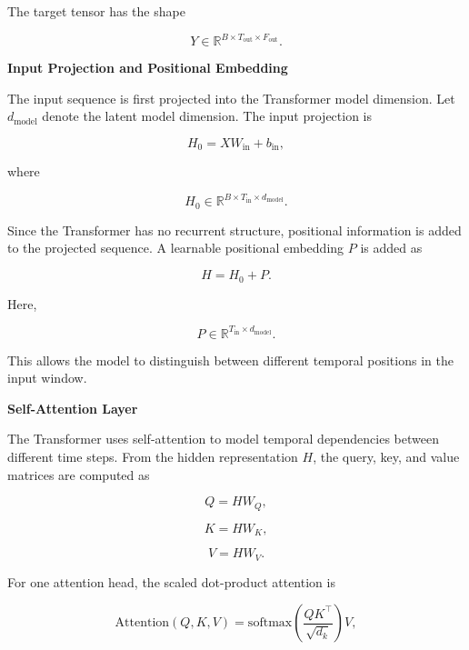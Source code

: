 \documentclass{book}
\providecommand{\ProjectDeepHeading}[2]{%
    \par\medskip\noindent\textbf{#2}\par\smallskip
}
\begin{document}
        The target tensor has the shape
        
        \[
            Y
            \in
            \mathbb{R}^{B \times T_{\mathrm{out}} \times F_{\mathrm{out}}}.
        \]
    
    
    \ProjectDeepHeading{8}{Input Projection and Positional Embedding}
        
        The input sequence is first projected into the Transformer model dimension. Let \(d_{\mathrm{model}}\) denote the latent model dimension. The input projection is
        
        \[
            H_0
            =
            XW_{\mathrm{in}}
            +
            b_{\mathrm{in}},
        \]
        
        where
        
        \[
            H_0
            \in
            \mathbb{R}^{B \times T_{\mathrm{in}} \times d_{\mathrm{model}}}.
        \]
        
        Since the Transformer has no recurrent structure, positional information is added to the projected sequence. A learnable positional embedding \(P\) is added as
        
        \[
            H
            =
            H_0
            +
            P.
        \]
        
        Here,
        
        \[
            P
            \in
            \mathbb{R}^{T_{\mathrm{in}} \times d_{\mathrm{model}}}.
        \]
        
        This allows the model to distinguish between different temporal positions in the input window.
    
    
    \ProjectDeepHeading{8}{Self-Attention Layer}
        
        The Transformer uses self-attention to model temporal dependencies between different time steps. From the hidden representation \(H\), the query, key, and value matrices are computed as
        
        \[
            Q
            =
            HW_Q,
        \]
        
        \[
            K
            =
            HW_K,
        \]
        
        \[
            V
            =
            HW_V.
        \]
        
        For one attention head, the scaled dot-product attention is
        
        \[
            \mathrm{Attention}
            \left(
                Q,
                K,
                V
            \right)
            =
            \mathrm{softmax}
            \left(
                \frac{
                    QK^{\top}
                }{
                    \sqrt{d_k}
                }
            \right)
            V,
        \]
        
\end{document}
